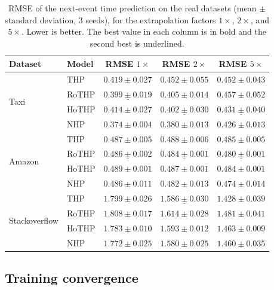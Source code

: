 \begin{table}[h!]
\centering
\caption{RMSE of the next-event time prediction on the real datasets (mean $\pm$ standard deviation, 3 seeds), for the extrapolation factors $1\times$, $2\times$, and $5\times$. Lower is better. The best value in each column is in bold and the second best is underlined.}
\label{tab:rmse-reais}
\begin{tabular}{llccc}
\toprule
Dataset & Model & RMSE $1\times$ & RMSE $2\times$ & RMSE $5\times$ \\
\midrule
\multirow{4}{*}{Taxi}
    & THP    & $0.419 \pm 0.027$ & $0.452 \pm 0.055$ & $0.452 \pm 0.043$ \\
    & RoTHP  & $\underline{0.399 \pm 0.019}$ & $0.405 \pm 0.014$ & $0.457 \pm 0.052$ \\
    & HoTHP  & $0.414 \pm 0.027$ & $\underline{0.402 \pm 0.030}$ & $\underline{0.431 \pm 0.040}$ \\
    & NHP    & $\mathbf{0.374 \pm 0.004}$ & $\mathbf{0.380 \pm 0.013}$ & $\mathbf{0.426 \pm 0.013}$ \\
\midrule
\multirow{4}{*}{Amazon}
    & THP    & $0.487 \pm 0.005$ & $0.488 \pm 0.006$ & $0.485 \pm 0.005$ \\
    & RoTHP  & $\underline{0.486 \pm 0.002}$ & $\underline{0.484 \pm 0.001}$ & $\underline{0.480 \pm 0.001}$ \\
    & HoTHP  & $0.489 \pm 0.001$ & $0.487 \pm 0.001$ & $0.484 \pm 0.001$ \\
    & NHP    & $\mathbf{0.486 \pm 0.011}$ & $\mathbf{0.482 \pm 0.013}$ & $\mathbf{0.474 \pm 0.014}$ \\
\midrule
\multirow{4}{*}{Stackoverflow}
    & THP    & $1.799 \pm 0.026$ & $\underline{1.586 \pm 0.030}$ & $\mathbf{1.428 \pm 0.039}$ \\
    & RoTHP  & $1.808 \pm 0.017$ & $1.614 \pm 0.028$ & $1.481 \pm 0.041$ \\
    & HoTHP  & $\underline{1.783 \pm 0.010}$ & $1.593 \pm 0.012$ & $1.463 \pm 0.009$ \\
    & NHP    & $\mathbf{1.772 \pm 0.025}$ & $\mathbf{1.580 \pm 0.025}$ & $\underline{1.460 \pm 0.035}$ \\
\bottomrule
\end{tabular}
\end{table}

\subsection{Training convergence}
\label{subsec:convergencia}


